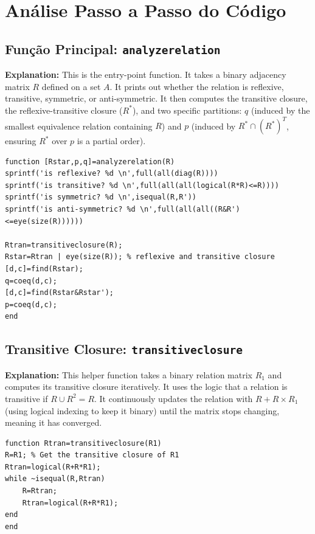 \section{Análise Passo a Passo do Código}

\subsection{Função Principal: \texttt{analyzerelation}}
\textbf{Explanation:} This is the entry-point function. It takes a binary adjacency matrix $R$ defined on a set $A$. It prints out whether the relation is reflexive, transitive, symmetric, or anti-symmetric. It then computes the transitive closure, the reflexive-transitive closure ($R^*$), and two specific partitions: $q$ (induced by the smallest equivalence relation containing $R$) and $p$ (induced by $R^* \cap (R^*)^T$, ensuring $R^*$ over $p$ is a partial order).

\begin{lstlisting}[caption={Main Function Snippet}]
function [Rstar,p,q]=analyzerelation(R)
sprintf('is reflexive? %d \n',full(all(diag(R))))
sprintf('is transitive? %d \n',full(all(all(logical(R*R)<=R))))
sprintf('is symmetric? %d \n',isequal(R,R'))
sprintf('is anti-symmetric? %d \n',full(all(all((R&R')<=eye(size(R))))))

Rtran=transitiveclosure(R);
Rstar=Rtran | eye(size(R)); % reflexive and transitive closure
[d,c]=find(Rstar);
q=coeq(d,c);
[d,c]=find(Rstar&Rstar');
p=coeq(d,c);
end
\end{lstlisting}

\subsection{Transitive Closure: \texttt{transitiveclosure}}
\textbf{Explanation:} This helper function takes a binary relation matrix $R_1$ and computes its transitive closure iteratively. It uses the logic that a relation is transitive if $R \cup R^2 = R$. It continuously updates the relation with $R + R \times R_1$ (using logical indexing to keep it binary) until the matrix stops changing, meaning it has converged.

\begin{lstlisting}[caption={Transitive Closure Snippet}]
function Rtran=transitiveclosure(R1)
R=R1; % Get the transitive closure of R1
Rtran=logical(R+R*R1);
while ~isequal(R,Rtran)
    R=Rtran;
    Rtran=logical(R+R*R1);
end
end
\end{lstlisting}

